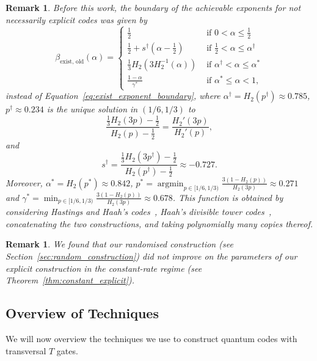 \documentclass{article}
\newcounter{main}[section]
\newtheorem{remark}[main]{Remark}
\DeclareMathOperator{\argmin}{argmin}
\begin{document}
\begin{remark}\label{rmk:exist_old_sub_constant}
    Before this work, the boundary of the achievable exponents for not necessarily explicit codes was given by
    \begin{equation}
        \beta_{\text{exist, old}}(\alpha) = \begin{cases}
            \frac{1}{2} &\text{ if } 0<\alpha \leq \frac{1}{2}\\
            \frac{1}{2} + s^\dagger\left(\alpha-\frac{1}{2}\right) &\text{ if }\frac{1}{2}<\alpha \leq \alpha^\dagger\\
            \frac{1}{3}H_2(3H_2^{-1}(\alpha)) &\text{ if }\alpha^\dagger < \alpha \leq \alpha^*\\
            \frac{1-\alpha}{\gamma^*} &\text{ if } \alpha^* \leq \alpha < 1,
        \end{cases}
    \end{equation}
    instead of Equation~\eqref{eq:exist_exponent_boundary}, where $\alpha^\dagger = H_2(p^\dagger) \approx 0.785$, $p^\dagger \approx 0.234$ is the unique solution in $(1/6,1/3)$ to
    \begin{equation}
        \frac{\frac{1}{3}H_2(3p)-\frac{1}{2}}{H_2(p)-\frac{1}{2}}
        =
        \frac{H_2'(3p)}{H_2'(p)},
    \end{equation}
    and
    \begin{equation}
        s^\dagger
        =
        \frac{\frac{1}{3}H_2(3p^\dagger)-\frac{1}{2}}{H_2(p^\dagger)-\frac{1}{2}}
        \approx -0.727.
    \end{equation}
    Moreover, $\alpha^* = H_2(p^*) \approx 0.842$, $p^* = \argmin_{p \in [1/6,1/3)}\frac{3(1-H_2(p))}{H_2(3p)} \approx 0.271$ and $\gamma^* = \min_{p \in [1/6,1/3)}\frac{3(1-H_2(p))}{H_2(3p)} \approx 0.678$. This function is obtained by considering Hastings and Haah's codes~\cite{hastings2018distillation}, Haah's divisible tower codes~\cite{haah2018towers}, concatenating the two constructions, and taking polynomially many copies thereof.
\end{remark}
\begin{remark}
    We found that our randomised construction (see Section~\ref{sec:random_construction}) did not improve on the parameters of our explicit construction in the constant-rate regime (see Theorem~\ref{thm:constant_explicit}).
\end{remark}




\subsection{Overview of Techniques}
We will now overview the techniques we use to construct quantum codes with transversal $T$ gates. 
\end{document}
